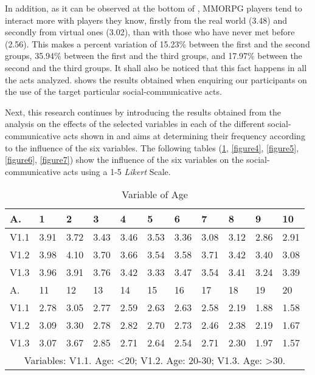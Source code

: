 \documentclass[english]{textolivre}
\begin{document}
In addition, as it can be observed at the bottom of , MMORPG players tend to interact more with players they know, firstly from the real world (3.48) and secondly from virtual ones (3.02), than with those who have never met before (2.56). This makes a percent variation of 15.23\% between the first and the second groups, 35.94\% between the first and the third groups, and 17.97\% between the second and the third groups. It shall also be noticed that this fact happens in all the acts analyzed.  shows the results obtained when enquiring our participants on the use of the target particular social-communicative acts. 

Next, this research continues by introducing the results obtained from the analysis on the effects of the selected variables in each of the different social-communicative acts shown in  and aims at determining their frequency according to the influence of the six variables. The following tables (\ref{figure3}, \ref{figure4}, \ref{figure5}, \ref{figure6}, \ref{figure7}) show the influence of the six variables on the social-communicative acts using a 1-5 \emph{Likert} Scale.

\begin{table}[htpb]
\caption{Variable of Age}
\label{figure3}
\centering
\begin{tabular}{lllllllllll}
\toprule
A. & 1 & 2 & 3 & 4 & 5 & 6 & 7 & 8 & 9 & 10
\\ 
\midrule
V1.1 & 3.91 & 3.72 & 3.43 & 3.46 & 3.53 & 3.36 & 3.08 & 3.12 & 2.86 & 2.91
\\
V1.2 & 3.98 & 4.10 & 3.70 & 3.66 & 3.54 & 3.58 & 3.71 & 3.42 & 3.40 & 3.08
\\
V1.3 & 3.96 & 3.91 & 3.76 & 3.42 & 3.33 & 3.47 & 3.54 & 3.41 & 3.24 & 3.39
\\
\midrule
A. & 11 & 12 & 13 & 14 & 15 & 16 & 17 & 18 & 19 & 20
\\
\midrule
V1.1 & 2.78 & 3.05 & 2.77 & 2.59 & 2.63 & 2.63 & 2.58 & 2.19 & 1.88 & 1.58
\\
V1.2 & 3.09 & 3.30 & 2.78 & 2.82 & 2.70 & 2.73 & 2.46 & 2.38 & 2.19 & 1.67
\\
V1.3 & 3.07 & 3.67 & 2.85 & 2.71 & 2.64 & 2.54 & 2.71 & 2.30 & 1.97 & 1.57
\\ 
\midrule
\multicolumn{11}{c}{Variables: V1.1. Age: <20; V1.2. Age: 20-30; V1.3. Age: >30.}
\\
\bottomrule
\end{tabular}
\centering
\end{table}
\end{document}
